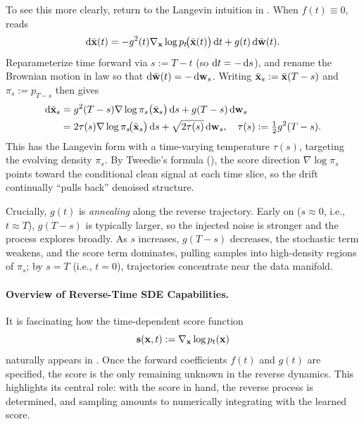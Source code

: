 To see this more clearly, return to the Langevin intuition in . When $f(t)\equiv 0$,  reads
\[
\mathop{}\!\mathrm{d}\bar{{\mathbf{x}}}(t)
= - g^2(t) \nabla_{{\mathbf{x}}}\log p_t\!\big(\bar{{\mathbf{x}}}(t)\big) \mathop{}\!\mathrm{d} t
+ g(t)  \mathop{}\!\mathrm{d}\bar{{\mathbf{w}}}(t).
\]
Reparameterize time forward via $s:=T-t$ (so $\mathop{}\!\mathrm{d} t=-\mathop{}\!\mathrm{d} s$), and rename the Brownian motion in law so that $\mathop{}\!\mathrm{d}\bar{{\mathbf{w}}}(t)=-\mathop{}\!\mathrm{d}{\mathbf{w}}_s$. Writing $\bar{{\mathbf{x}}}_s:=\bar{{\mathbf{x}}}(T-s)$ and $\pi_s:=p_{T-s}$ then gives
\begin{align*}
    \mathop{}\!\mathrm{d}\bar{{\mathbf{x}}}_s
&= g^2(T-s) \nabla\log \pi_s \big(\bar{{\mathbf{x}}}_s\big) \mathop{}\!\mathrm{d} s
+ g(T-s) \mathop{}\!\mathrm{d}{\mathbf{w}}_s
\\&=
2\tau(s) \nabla\log \pi_s\!\big(\bar{{\mathbf{x}}}_s\big) \mathop{}\!\mathrm{d} s
+ \sqrt{2\tau(s)} \mathop{}\!\mathrm{d}{\mathbf{w}}_s,
\quad
\tau(s):=\tfrac{1}{2}g^2(T-s).
\end{align*}
This has the Langevin form with a time-varying temperature $\tau(s)$, targeting the evolving density $\pi_s$. By Tweedie's formula (), the score direction $\nabla\log \pi_s$ points toward the conditional clean signal at each time slice, so the drift continually ``pulls back'' denoised structure.

Crucially, $g(t)$ is \emph{annealing} along the reverse trajectory. Early on ($s\approx 0$, i.e., $t\approx T$), $g(T-s)$ is typically larger, so the injected noise is stronger and the process explores broadly. As $s$ increases, $g(T-s)$ decreases, the stochastic term weakens, and the score term dominates, pulling samples into high-density regions of $\pi_s$; by $s=T$ (i.e., $t=0$), trajectories concentrate near the data manifold.




\paragraph{Overview of Reverse-Time SDE Capabilities.}

It is fascinating how the time-dependent score function
\[
{\mathbf{s}}({\mathbf{x}}, t) := \nabla_{{\mathbf{x}}} \log p_t({\mathbf{x}})
\]
naturally appears in . Once the forward coefficients $f(t)$ and $g(t)$ are specified, the score is the only remaining unknown in the reverse dynamics. This highlights its central role: with the score in hand, the reverse process is determined, and sampling amounts to numerically integrating  with the learned score.

